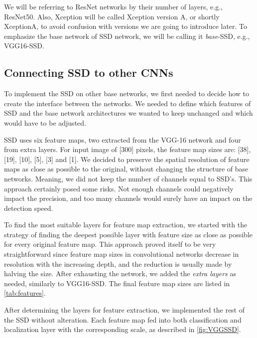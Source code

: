 We will be referring to ResNet networks by their number of layers, e.g., ResNet50. Also, Xception will be called Xception version A, or shortly XceptionA, to avoid confusion with versions we are going to introduce later. To emphasize the base network of SSD network, we will be calling it \textit{base}-SSD, e.g., VGG16-SSD.

\subsection{Connecting SSD to other CNNs}
To implement the SSD on other base networks, we first needed to decide how to create the interface between the networks. We needed to define which features of SSD and the base network architectures we wanted to keep unchanged and which would have to be adjusted.

SSD uses six feature maps, two extracted from the VGG-16 network and four from extra layers. For input image of [300] pixels, the feature map sizes are: [38], [19], [10], [5], [3] and [1]. We decided to preserve the spatial resolution of feature maps as close as possible to the original, without changing the structure of base networks. Meaning, we did not keep the number of channels equal to SSD's. This approach certainly posed some risks. Not enough channels could negatively impact the precision, and too many channels would surely have an impact on the detection speed.

To find the most suitable layers for feature map extraction, we started with the strategy of finding the deepest possible layer with feature size as close as possible for every original feature map. This approach proved itself to be very straightforward since feature map sizes in convolutional networks decrease in resolution with the increasing depth, and the reduction is usually made by halving the size. After exhausting the network, we added the \textit{extra layers} as needed, similarly to VGG16-SSD. The final feature map sizes are listed in \cref{tab:features}. 

After determining the layers for feature extraction, we implemented the rest of the SSD without alteration. Each feature map fed into both classification and localization layer with the corresponding scale, as described in \cref{fig:VGGSSD}. 


